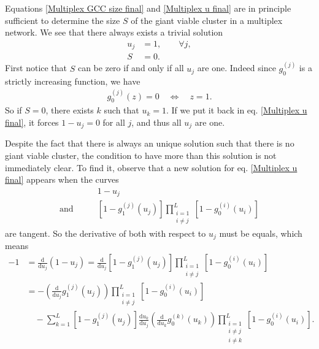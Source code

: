 \documentclass[
11pt, %
english, %
singlespacing, %
liststotoc, %
headsepline, %
]{MastersDoctoralThesis} %
\newcommand{\total}{\text{d}}
\begin{document}
Equations \eqref{Multiplex GCC size final} and \eqref{Multiplex u final} are in principle sufficient to determine the size $S$ of the giant viable cluster in a multiplex network. We see that there always exists a trivial solution
\begin{align}
	u_j &= 1, \qquad \forall j,\\
	S &= 0.
\end{align}
First notice that $S$ can be zero if and only if all $u_j$ are one. Indeed since $g_0^{(j)}$ is a strictly increasing function, we have
\begin{align}
	g_0^{(j)}(z) = 0 \quad \Leftrightarrow \quad z = 1.
\end{align}
So if $S = 0$, there exists $k$ such that $u_k = 1$. If we put it back in eq. \eqref{Multiplex u final}, it forces $1 - u_j = 0$ for all $j$, and thus all $u_j$ are one.

Despite the fact that there is always an unique solution such that there is no giant viable cluster, the condition to have more than this solution is not immediately clear. To find it, observe that a new solution for eq. \eqref{Multiplex u final} appears when the curves
\begin{align}
	&1 - u_j\\
	 \text{and} \qquad &\left[1 - g_1^{(j)}(u_j) \right] \prod_{\substack{i = 1 \\ i \neq j}}^{L}  \left[1 - g_0^{(i)}(u_i) \right]
\end{align}
are tangent. So the derivative of both with respect to $u_j$ must be equals, which means
\begin{align}
	-1 &= \frac{\total}{\total u_j} (1 - u_j) = \frac{\total}{\total u_j} \left[1 - g_1^{(j)}(u_j) \right] \prod_{\substack{i = 1 \\ i \neq j}}^{L}  \left[1 - g_0^{(i)}(u_i) \right]\\
	&= - \left(\frac{\total}{\total u_j} g_1^{(j)}(u_j)\right) \prod_{\substack{i = 1 \\ i \neq j}}^{L}  \left[1 - g_0^{(i)}(u_i) \right] \\
	&\quad - \sum_{k = 1}^L \left[1 - g_1^{(j)}(u_j) \right] \frac{\total u_k}{\total u_j} \left(\frac{\total}{\total u_k} g_0^{(k)}(u_k)\right)\prod_{\substack{i = 1 \\ i \neq j\\ i \neq k}}^{L}  \left[1 - g_0^{(i)}(u_i) \right].
\end{align}
\end{document}

